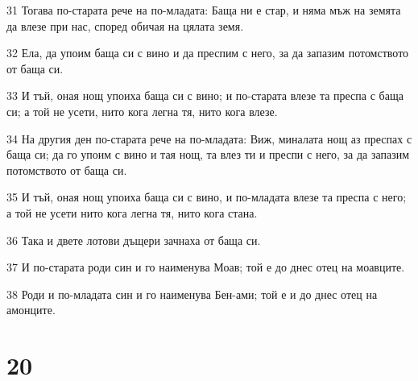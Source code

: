 \par 31 Тогава по-старата рече на по-младата: Баща ни е стар, и няма мъж на земята да влезе при нас, според обичая на цялата земя.
\par 32 Ела, да упоим баща си с вино и да преспим с него, за да запазим потомството от баща си.
\par 33 И тъй, оная нощ упоиха баща си с вино; и по-старата влезе та преспа с баща си; а той не усети, нито кога легна тя, нито кога влезе.
\par 34 На другия ден по-старата рече на по-младата: Виж, миналата нощ аз преспах с баща си; да го упоим с вино и тая нощ, та влез ти и преспи с него, за да запазим потомството от баща си.
\par 35 И тъй, оная нощ упоиха баща си с вино, и по-младата влезе та преспа с него; а той не усети нито кога легна тя, нито кога стана.
\par 36 Така и двете лотови дъщери зачнаха от баща си.
\par 37 И по-старата роди син и го наименува Моав; той е до днес отец на моавците.
\par 38 Роди и по-младата син и го наименува Бен-ами; той е и до днес отец на амонците.

\chapter{20}

